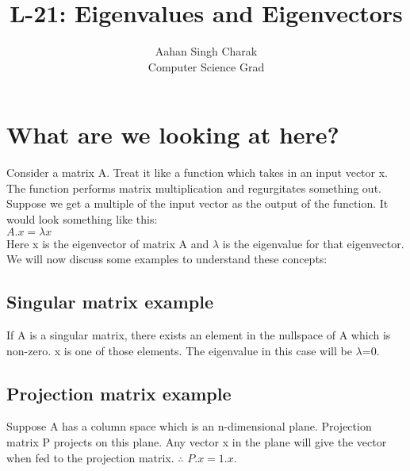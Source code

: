 \documentclass[]{article}
\title{L-21: Eigenvalues and Eigenvectors}
\author{Aahan Singh Charak\\Computer Science Grad}
\begin{document}
	\maketitle
	\section{What are we looking at here?}
	\vspace{10pt}
	Consider a matrix A. Treat it like a function which takes in an input vector x. The function performs matrix multiplication and regurgitates something out. Suppose we get a multiple of the input vector as the output of the function. It would look something like this:\\
	
	\noindent
	$A.x=\lambda x$\\
	
	\noindent
	Here x is the eigenvector of matrix A and $\lambda$ is the eigenvalue for that eigenvector.\\
	
	\noindent
	We will now discuss some examples to understand these concepts:\\
	
	\vspace{10pt}
	
	\subsection{Singular matrix example}
    
	\vspace{10pt}
	
	If A is a singular matrix, there exists an element in the nullspace of A which is non-zero. x is one of those elements. The eigenvalue in this case will be $\lambda$=0.
	
	\vspace{10pt}
	
	\subsection{Projection matrix example}
	
	\vspace{10pt}
	
	Suppose A has a column space which is an n-dimensional plane. Projection matrix P projects on this plane. Any vector x in the plane will give the vector when fed to the projection matrix. $\therefore$ $P.x=1.x$.\\
	
\end{document}
